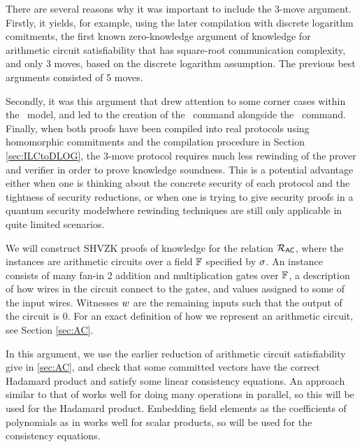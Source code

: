 There are several reasons why it was important to include the 3-move argument. Firstly, it yields, for example, using the later compilation with discrete logarithm comitments, the first known zero-knowledge argument of knowledge for arithmetic circuit satisfiability that has square-root communication complexity, and only 3 moves, based on the discrete logarithm assumption. The previous best arguments \cite{Seo2011a,Groth2009b} consisted of 5 moves.

Secondly, it was this argument that drew attention to some corner cases within the \ILC\ model, and led to the creation of the \ILCcheck\ command alongside the \ILCopen\ command. Finally, when both proofs have been compiled into real protocols using homomorphic commitments and the compilation procedure in Section \ref{sec:ILCtoDLOG}, the 3-move protocol requires much less rewinding of the prover and verifier in order to prove knowledge soundness. This is a potential advantage either when one is thinking about the concrete security of each protocol and the tightness of security reductions, or when one is trying to give security proofs in a quantum security model\footnotemark[1] where rewinding techniques are still only applicable in quite limited scenarios.


We will construct SHVZK proofs of knowledge for the relation $\mathcal{R}_{\mathsf{AC}}$, where the instances are arithmetic circuits over a field $\mathbb{F}$ specified by $\mathsf{\sigma}$. An instance consists of many fan-in 2 addition and multiplication gates over $\mathbb{F}$, a description of how wires in the circuit connect to the gates, and values assigned to some of the input wires. Witnesses $w$ are the remaining inputs such that the output of the circuit is $0$. For an exact definition of how we represent an arithmetic circuit, see Section \ref{sec:AC}.

In this argument, we use the earlier reduction of arithmetic circuit satisfiability give in \ref{sec:AC}, and check that some committed vectors have the correct Hadamard product and satisfy some linear consistency equations. An approach similar to that of \cite{PHGR13} works well for doing many operations in parallel, so this will be used for the Hadamard product. Embedding field elements as the coefficients of polynomials as in \cite{Groth2009b} works well for scalar products, so will be used for the consistency equations.

